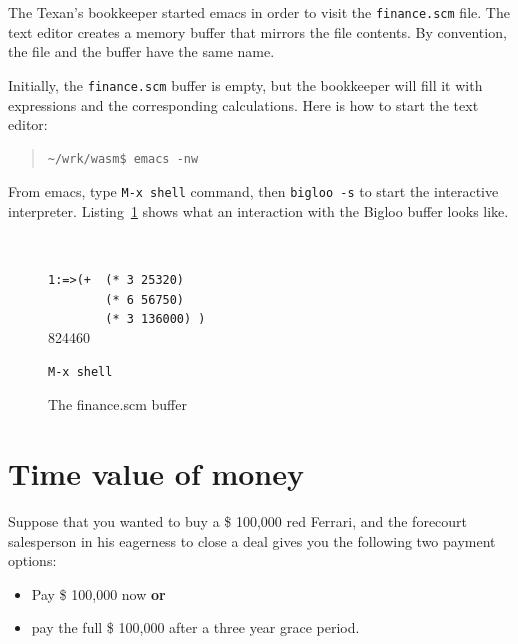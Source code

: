 \documentclass[a4paper,12pt]{book}
\newenvironment{fmpage}[1]
           {\begin{lrbox}{\fmbox}\begin{minipage}{#1}}
           {\end{minipage}\end{lrbox}\fbox{\usebox{\fmbox}}}
\begin{document}
The Texan's bookkeeper started emacs
in order to visit the \verb|finance.scm|
file. The text editor creates a memory
buffer that mirrors the file contents.
By convention, the file and the buffer
have the same name.

Initially, the \verb|finance.scm| buffer
is empty, but the bookkeeper will fill it
with expressions and the corresponding
calculations. Here is how to start the
text editor:
\begin{quote}
\begin{verbatim}
~/wrk/wasm$ emacs -nw
\end{verbatim}
\end{quote}
From emacs, type \verb|M-x shell| command, then
\verb|bigloo -s| to start the interactive
interpreter. Listing~\ref{texan:photos} shows what
an interaction with the Bigloo buffer looks like.

\begin{figure}[!h]
\begin{fmpage}{0.8\textwidth}
  \begin{verbatim}


  \end{verbatim}
\end{fmpage}

\begin{fmpage}{0.8\textwidth}
\verb|1:=>(+  (* 3 25320)|\\
\verb|        (* 6 56750)|\\
\verb|        (* 3 136000) )|\\ 
824460
\end{fmpage}

\begin{fmpage}{0.8\textwidth}
\begin{verbatim}
M-x shell 
\end{verbatim}
\end{fmpage}
\caption{The finance.scm buffer}
\label{texan:photos}
\end{figure}


\section{Time value of money}
Suppose that you wanted to buy a \$ 100,000 red Ferrari,
and the forecourt salesperson in his eagerness to
close a deal gives you the following two payment options:  
\begin{itemize}
\item Pay \$ 100,000 now {\bf or}
\item pay the full \$ 100,000 after a three year grace period.
\end{itemize}
\end{document}
